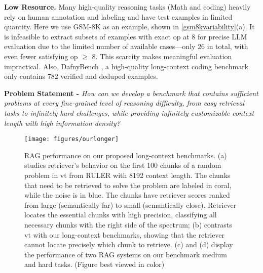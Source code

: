 \textbf{Low Resource.} Many high-quality reasoning tasks (Math and coding) heavily rely on human annotation and labeling and have test examples in limited quantity. Here we use GSM-8K \citep{cobbe2021trainingverifierssolvemath} as an example, shown in \cref{gsm8kvariability}(a). It is infeasible to extract subsets of examples with exact op at 8 for precise LLM evaluation due to the limited number of available cases—only 26 in total, with even fewer satisfying op $\geq$ 8. This scarcity makes meaningful evaluation impractical. Also, DafnyBench \citep{loughridge2024dafnybenchbenchmarkformalsoftware}, a high-quality long-context coding benchmark only contains 782 verified and deduped examples. 

\textbf{Problem Statement -} \textit{How can we develop a benchmark that contains sufficient problems at every fine-grained level of reasoning difficulty, from easy retrieval tasks to infinitely hard challenges, while providing infinitely customizable context length with high information density?} 
\label{lcllm} 

\begin{figure*}
    \texttt{[image: figures/ourlonger]} 
    \caption{RAG performance on our proposed long-context benchmarks. (a) studies retriever's behavior on the first 100 chunks of a random problem in vt from RULER with 8192 context length. The chunks that need to be retrieved to solve the problem are labeled in coral, while the noise is in blue. The chunks have retriever scores ranked from large (semantically far) to small (semantically close). Retriever locates the essential chunks with high precision, classifying all necessary chunks with the right side of the spectrum; (b) contrasts vt with our long-context benchmarks, showing that the retriever cannot locate precisely which chunk to retrieve. (c) and (d) display the performance of two RAG systems on our benchmark medium and hard tasks. (Figure best viewed in color)} 
    \label{mediumandhard} 
\end{figure*} 

